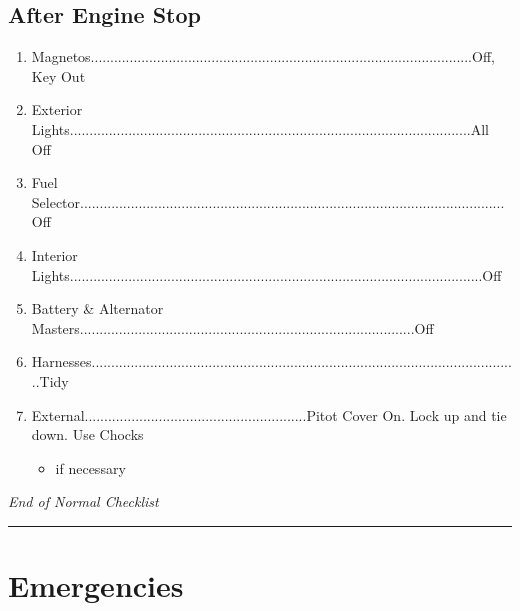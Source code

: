 \documentclass[a4paper]{article}
\newenvironment{checklist}{
  \begin{itemize}[leftmargin=*, align=left]
    \setlength{\itemsep}{2pt}
    \setlength{\parskip}{0pt}
    \setlength{\parsep}{0pt}
}{
  \end{itemize}
}
\newenvironment{numberedchecklist}{
  \begin{enumerate}[label=\arabic*., leftmargin=*, align=left]
    \setlength{\itemsep}{2pt}
    \setlength{\parskip}{0pt}
    \setlength{\parsep}{0pt}
}{
  \end{enumerate}
}
\begin{document}
\subsection*{After Engine Stop}
\begin{numberedchecklist}
\item Magnetos..................................................................................................Off, Key Out
\item Exterior Lights.......................................................................................................All Off
\item Fuel Selector.............................................................................................................Off
\item Interior Lights..........................................................................................................Off
\item Battery \& Alternator Masters......................................................................................Off
\item Harnesses..............................................................................................................Tidy
\item External.........................................................Pitot Cover On. Lock up and tie down. Use Chocks
  \begin{checklist}
  \item if necessary
  \end{checklist}
\end{numberedchecklist}
\textit{End of Normal Checklist}

\rule{\linewidth}{0.4pt}

\section*{Emergencies}
\end{document}
